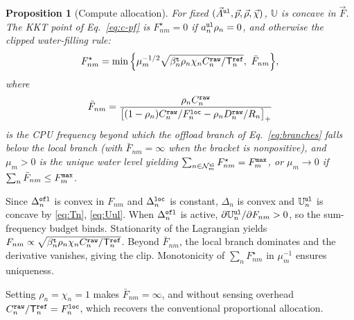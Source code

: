 \documentclass[journal]{IEEEtran}
\newtheorem{proposition}{Proposition}
\begin{document}
\begin{proposition}[Compute allocation]\label{prop:F}
For fixed $(\vec{A}^{\tt ul},\vec{p},\vec{\rho},\vec{\chi})$, $\mathbb{U}$ is concave in $\vec{F}$. The KKT point of Eq.~\eqref{eq:c-pf} is $F_{nm}^\star=0$ if $a_n^{\tt ul}\rho_n=0$, and otherwise the clipped water-filling rule:
\begin{equation}
F_{nm}^\star
=\min\Big\{\mu_m^{-1/2}\sqrt{\beta_n^{\tt t}\rho_n\chi_n C_n^{\tt raw}/\mathsf{T}_n^{\tt ref}},\ \bar F_{nm}\Big\},
\label{eq:Fstar}
\end{equation}
where
\begin{equation}
\bar F_{nm}
=\frac{\rho_n C_n^{\tt raw}}
{\big[(1-\rho_n)C_n^{\tt raw}/F_n^{\tt loc}-\rho_n D_n^{\tt raw}/R_n\big]_+}
\label{eq:Fbar}
\end{equation}
is the {CPU frequency} beyond which the offload branch of Eq.~\eqref{eq:branches} falls below the local branch (with $\bar F_{nm}=\infty$ when the bracket is nonpositive), and $\mu_m>0$ is the unique water level yielding $\sum_{n\in\mathcal{N}_m^{\tt ul}}F_{nm}^\star=F_m^{\tt max}$, or $\mu_m\to0$ if $\sum_n\bar F_{nm}\le F_m^{\tt max}$.
\end{proposition}
\begin{IEEEproof}
Since $\Delta_n^{\tt ofl}$ is convex in $F_{nm}$ and $\Delta_n^{\tt loc}$ is constant, $\Delta_n$ is convex and $\mathbb{U}_n^{\tt ul}$ is concave by \eqref{eq:Tn}, \eqref{eq:Uul}. When $\Delta_n^{\tt ofl}$ is active, $\partial\mathbb{U}_n^{\tt ul}/\partial F_{nm}>0$, so the sum-frequency budget binds. Stationarity of the Lagrangian yields $F_{nm}\propto\sqrt{\beta_n^{\tt t}\rho_n\chi_n C_n^{\tt raw}/\mathsf{T}_n^{\tt ref}}$. Beyond $\bar F_{nm}$, the local branch dominates and the derivative vanishes, giving the clip. Monotonicity of $\sum_n F_{nm}^\star$ in $\mu_m^{-1}$ ensures uniqueness.
\end{IEEEproof}
Setting $\rho_n=\chi_n=1$ makes $\bar F_{nm}=\infty$, and without sensing overhead $C_n^{\tt raw}/\mathsf{T}_n^{\tt ref}=F_n^{\tt loc}$, which recovers the conventional proportional allocation.
\end{document}
